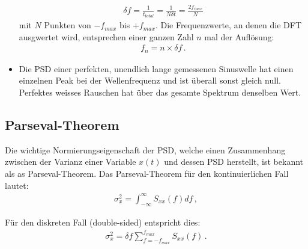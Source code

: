 \begin{itemize}
        \begin{align}
        \delta f  = \frac{ 1 }{t_{total}} = \frac{ 1 }{ N \delta t} = \frac{ 2 f_{max} }{ N }
        \label{eq:vl7-6}
        \end{align}
        mit $N$ Punkten von $-f_{max}$ bis $+f_{max}$. Die Frequenzwerte, an denen die DFT ausgwertet wird, entsprechen einer ganzen Zahl $n$ mal der Aufl\"osung:
        \begin{align}
        f_n = n \times \delta f\,.
        \label{eq:vl7-7}
        \end{align}
        \item Die PSD einer perfekten, unendlich lange gemessenen Sinuswelle hat einen einzelnen Peak bei der Wellenfrequenz und ist überall sonst gleich null. Perfektes weisses Rauschen hat über das gesamte Spektrum denselben Wert.
\end{itemize}


\subsection{Parseval-Theorem}
\label{subsec:vl7-4}

Die wichtige Normierungseigenschaft der PSD, welche einen Zusammenhang zwischen der Varianz einer Variable $x(t)$ und dessen PSD herstellt, ist bekannt als as Parseval-Theorem. Das Parseval-Theorem f\"ur den kontinuierlichen Fall lautet:
\begin{align}
\sigma_x^2 = \int_{- \infty}^\infty S_{xx} (f) df\,,
\label{eq:vl7-8}
\end{align}

F\"ur den diskreten Fall (double-sided) entspricht dies:
\begin{align}
\sigma_x^2 = \delta f \sum_{f = -f_{max}}^{f_{max}} S_{xx} (f)\,.
\label{eq:vl7-9}
\end{align}
